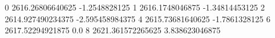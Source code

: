 0 2616.26806640625 -1.2548828125
1 2616.1748046875 -1.34814453125
2 2614.927490234375 -2.595458984375
4 2615.73681640625 -1.7861328125
6 2617.52294921875 0.0
8 2621.361572265625 3.838623046875
